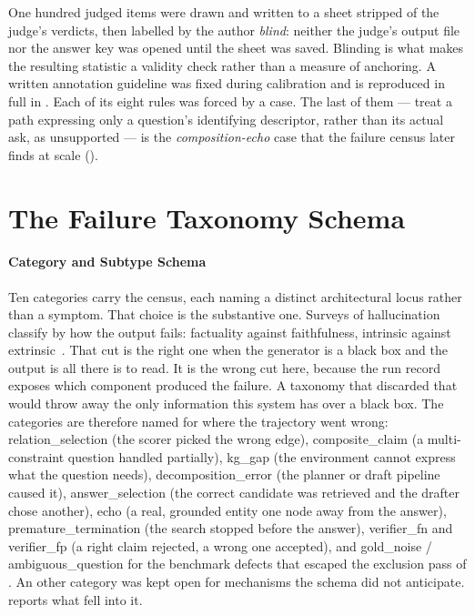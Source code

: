 One hundred judged items were drawn and written to a sheet stripped of the
judge's verdicts, then labelled by the author \emph{blind}: neither the judge's
output file nor the answer key was opened until the sheet was saved. Blinding is
what makes the resulting statistic a validity check rather than a measure of
anchoring. A written annotation guideline was fixed during calibration and is
reproduced in full in . Each of its eight rules was forced
by a case. The last of them --- treat a path expressing only a question's
identifying descriptor, rather than its actual ask, as unsupported --- is the
\emph{composition-echo} case that the failure census later finds at scale
().


\section{The Failure Taxonomy Schema}\label{app:taxonomy-schema}

\paragraph{Category and Subtype Schema}

Ten categories carry the census, each naming a distinct architectural
locus rather than a symptom. That choice is the
substantive one. Surveys of hallucination classify by how the output fails:
factuality against faithfulness, intrinsic against
extrinsic~\cite{huang2025survey}. That cut is the right one when the generator
is a black box and the output is all there is to read. It is the wrong cut here,
because the run record exposes which component produced the failure. A
taxonomy that discarded that would throw away the only information this system
has over a black box. The categories are therefore named for where the
trajectory went wrong: \textsf{relation\_selection} (the scorer picked the wrong
edge), \textsf{composite\_claim} (a multi-constraint question handled
partially), \textsf{kg\_gap} (the environment cannot express what the question
needs), \textsf{decomposition\_error} (the planner or draft pipeline caused it),
\textsf{answer\_selection} (the correct candidate was retrieved and the drafter
chose another), \textsf{echo} (a real, grounded entity one node away from the
answer), \textsf{premature\_termination} (the search stopped before the answer),
\textsf{verifier\_fn} and \textsf{verifier\_fp} (a right claim rejected, a wrong
one accepted), and \textsf{gold\_noise} / \textsf{ambiguous\_question} for the
benchmark defects that escaped the exclusion pass of . An
\textsf{other} category was kept open for mechanisms the schema did not
anticipate.  reports what fell into it.

